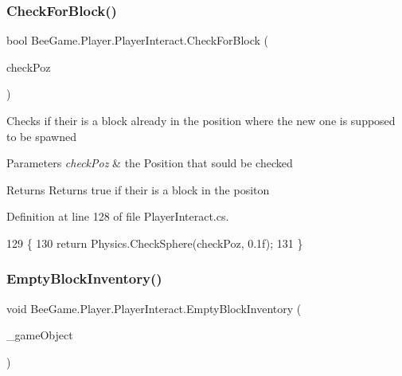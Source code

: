 \mbox{\label{class_bee_game_1_1_player_1_1_player_interact_a74a5e5d022edcbc28ab6956cbc8266c8}} 
\subsubsection{\texorpdfstring{Check\+For\+Block()}{CheckForBlock()}}
{\footnotesize\ttfamily bool Bee\+Game.\+Player.\+Player\+Interact.\+Check\+For\+Block (\begin{DoxyParamCaption}\item[{Vector3}]{check\+Poz }\end{DoxyParamCaption})\hspace{0.3cm}{\ttfamily [private]}}



Checks if their is a block already in the position where the new one is supposed to be spawned 


\begin{DoxyParams}{Parameters}
{\em check\+Poz} & the Position that sould be checked\\
\hline
\end{DoxyParams}
\begin{DoxyReturn}{Returns}
Returns true if their is a block in the positon
\end{DoxyReturn}


Definition at line 128 of file Player\+Interact.\+cs.


\begin{DoxyCode}
129         \{
130             \textcolor{keywordflow}{return} Physics.CheckSphere(checkPoz, 0.1f);
131         \}
\end{DoxyCode}
\mbox{\label{class_bee_game_1_1_player_1_1_player_interact_a5e24c97ecd41cfaceaf71d08409d8cca}} 
\subsubsection{\texorpdfstring{Empty\+Block\+Inventory()}{EmptyBlockInventory()}}
{\footnotesize\ttfamily void Bee\+Game.\+Player.\+Player\+Interact.\+Empty\+Block\+Inventory (\begin{DoxyParamCaption}\item[{Game\+Object}]{\+\_\+game\+Object }\end{DoxyParamCaption})\hspace{0.3cm}{\ttfamily [private]}}



